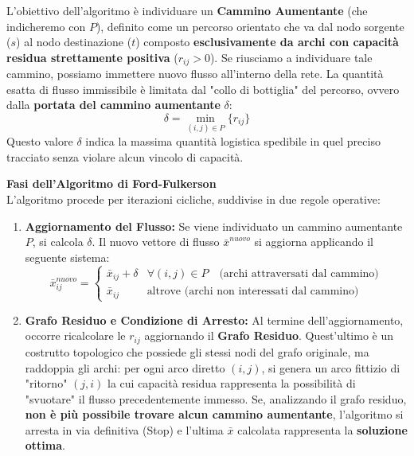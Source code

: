 \documentclass[12pt, a4paper]{article}
\newcommand{\separatore}{\noindent{\color{titlecolor!50}\rule{\textwidth}{0.6pt}}}
\begin{document}
	L'obiettivo dell'algoritmo è individuare un \textbf{Cammino Aumentante} (che indicheremo con $P$), definito come un percorso orientato che va dal nodo sorgente ($s$) al nodo destinazione ($t$) composto \textbf{esclusivamente da archi con capacità residua strettamente positiva} ($r_{ij} > 0$).
	Se riusciamo a individuare tale cammino, possiamo immettere nuovo flusso all'interno della rete. La quantità esatta di flusso immissibile è limitata dal "collo di bottiglia" del percorso, ovvero dalla \textbf{portata del cammino aumentante} $\delta$:
	\[ \delta = \min_{(i,j) \in P} \{ r_{ij} \} \]
	Questo valore $\delta$ indica la massima quantità logistica spedibile in quel preciso tracciato senza violare alcun vincolo di capacità.
	
	\vspace{0.4cm}
	\textbf{Fasi dell'Algoritmo di Ford-Fulkerson}\\
	L'algoritmo procede per iterazioni cicliche, suddivise in due regole operative:
	\begin{enumerate}
		\item \textbf{Aggiornamento del Flusso:} Se viene individuato un cammino aumentante $P$, si calcola $\delta$. Il nuovo vettore di flusso $\bar{x}^{nuovo}$ si aggiorna applicando il seguente sistema:
		\[
		\bar{x}_{ij}^{nuovo} = 
		\begin{cases}
			\bar{x}_{ij} + \delta & \forall (i,j) \in P \quad \text{(archi attraversati dal cammino)} \\
			\bar{x}_{ij} & \text{altrove (archi non interessati dal cammino)}
		\end{cases}
		\]
		\item \textbf{Grafo Residuo e Condizione di Arresto:} Al termine dell'aggiornamento, occorre ricalcolare le $r_{ij}$ aggiornando il \textbf{Grafo Residuo}. Quest'ultimo è un costrutto topologico che possiede gli stessi nodi del grafo originale, ma raddoppia gli archi: per ogni arco diretto $(i,j)$, si genera un arco fittizio di "ritorno" $(j,i)$ la cui capacità residua rappresenta la possibilità di "svuotare" il flusso precedentemente immesso. 
		Se, analizzando il grafo residuo, \textbf{non è più possibile trovare alcun cammino aumentante}, l'algoritmo si arresta in via definitiva (Stop) e l'ultima $\bar{x}$ calcolata rappresenta la \textbf{soluzione ottima}.
	\end{enumerate}
	
	\vspace{0.6cm}
	\separatore
	\vspace{0.4cm}
	
\end{document}

